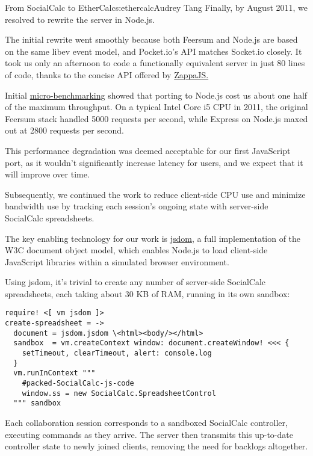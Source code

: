 \begin{aosachapter}{From SocialCalc to EtherCalc}{s:ethercalc}{Audrey Tang}
Finally, by August 2011, we resolved to rewrite the server in Node.js.


The initial rewrite went smoothly because both Feersum and Node.js are
based on the same libev event model, and Pocket.io's API matches
Socket.io closely. It took us only an afternoon to code a functionally
equivalent server in just 80 lines of code, thanks to the concise API
offered by \href{http://zappajs.com/}{ZappaJS.}

Initial \href{http://c9s.github.com/BenchmarkTest/}{micro-benchmarking}
showed that porting to Node.js cost us about one half of the maximum
throughput. On a typical Intel Core i5 CPU in 2011, the original Feersum
stack handled 5000 requests per second, while Express on Node.js maxed
out at 2800 requests per second.

This performance degradation was deemed acceptable for our first
JavaScript port, as it wouldn't significantly increase latency for
users, and we expect that it will improve over time.

Subsequently, we continued the work to reduce client-side CPU use and
minimize bandwidth use by tracking each session's ongoing state with
server-side SocialCalc spreadsheets.



The key enabling technology for our work is
\href{https://github.com/tmpvar/jsdom}{jsdom}, a full implementation of
the W3C document object model, which enables Node.js to load client-side
JavaScript libraries within a simulated browser environment.

Using jsdom, it's trivial to create any number of server-side SocialCalc
spreadsheets, each taking about 30 KB of RAM, running in its own
sandbox:

\begin{verbatim}
require! <[ vm jsdom ]>
create-spreadsheet = ->
  document = jsdom.jsdom \<html><body/></html>
  sandbox  = vm.createContext window: document.createWindow! <<< {
    setTimeout, clearTimeout, alert: console.log
  }
  vm.runInContext """
    #packed-SocialCalc-js-code
    window.ss = new SocialCalc.SpreadsheetControl
  """ sandbox
\end{verbatim}

Each collaboration session corresponds to a sandboxed SocialCalc
controller, executing commands as they arrive. The server then transmits
this up-to-date controller state to newly joined clients, removing the
need for backlogs altogether.


\end{aosachapter}
